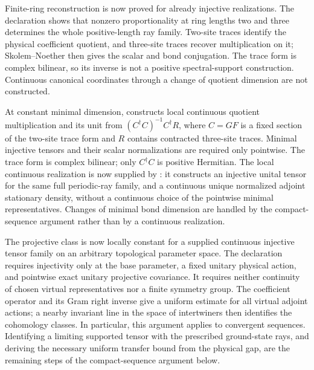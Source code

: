 \documentclass{article}
\begin{document}
Finite-ring reconstruction is now proved for already injective realizations.
The declaration
shows that nonzero proportionality at ring lengths two and three determines
the whole positive-length ray family. Two-site traces identify the physical
coefficient quotient, and three-site traces recover multiplication on it;
Skolem--Noether then gives the scalar and bond conjugation. The trace form
is complex bilinear, so its inverse is not a positive spectral-support
construction. Continuous canonical coordinates through a change of quotient
dimension are not constructed.

At constant minimal dimension,
constructs local continuous quotient multiplication and its unit from
$(C^\dagger C)^{-1}C^\dagger R$, where $C=GF$ is a fixed section of the
two-site trace form and $R$ contains contracted three-site traces. Minimal
injective tensors and their scalar normalizations are required only
pointwise. The trace form is complex bilinear; only $C^\dagger C$ is positive
Hermitian. The local continuous realization is now supplied by
:
it constructs an injective unital tensor for the same full periodic-ray family,
and a continuous unique normalized adjoint stationary density, without a
continuous choice of the pointwise minimal representatives. Changes of minimal
bond dimension are handled by the compact-sequence argument rather than by a
continuous realization.

The projective class is now locally constant for a supplied continuous
injective tensor family on an arbitrary topological parameter space.
The declaration
requires injectivity only at the base parameter, a fixed unitary physical
action, and pointwise exact unitary projective covariance. It requires neither
continuity of chosen virtual representatives nor a finite symmetry group.
The coefficient operator and its Gram right inverse give a uniform estimate
for all virtual adjoint actions; a nearby invariant line in the space of
intertwiners then identifies the cohomology classes. In particular, this
argument applies to convergent sequences. Identifying a limiting supported
tensor with the prescribed ground-state rays, and deriving the necessary
uniform transfer bound from the physical gap, are the remaining steps of the
compact-sequence argument below.
\end{document}
